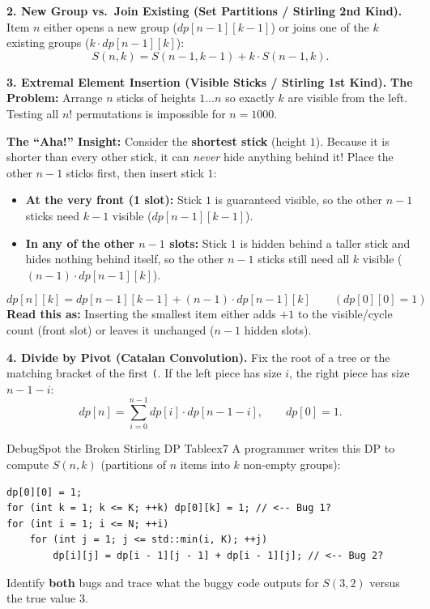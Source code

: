 \documentclass[11pt,a4paper]{article}
\theoremstyle{definition}
\newcommand{\painbeat}{\textbf{\color{accentamber}The Problem:} }
\newcommand{\ahabeat}{\textbf{\color{accentteal}The ``Aha!'' Insight:} }
\begin{document}
\noindent\textbf{2. New Group vs.\ Join Existing (Set Partitions / Stirling 2nd Kind).}
Item $n$ either opens a new group ($dp[n - 1][k - 1]$) or joins one of the $k$ existing groups ($k \cdot dp[n - 1][k]$):
\[
    S(n, k) = S(n - 1, k - 1) + k \cdot S(n - 1, k).
\]

\noindent\textbf{3. Extremal Element Insertion (Visible Sticks / Stirling 1st Kind).}
\painbeat Arrange $n$ sticks of heights $1 \dots n$ so exactly $k$ are visible from the left. Testing all $n!$ permutations is impossible for $n = 1000$.

\ahabeat Consider the \textbf{shortest stick} (height $1$). Because it is shorter than every other stick, it can \emph{never} hide anything behind it! Place the other $n - 1$ sticks first, then insert stick $1$:
\begin{itemize}
    \item \textbf{At the very front (1 slot):} Stick $1$ is guaranteed visible, so the other $n - 1$ sticks need $k - 1$ visible ($dp[n - 1][k - 1]$).
    \item \textbf{In any of the other $n - 1$ slots:} Stick $1$ is hidden behind a taller stick and hides nothing behind itself, so the other $n - 1$ sticks still need all $k$ visible ($(n - 1) \cdot dp[n - 1][k]$).
\end{itemize}

\begin{formulabox}
\[
    dp[n][k] = dp[n - 1][k - 1] + (n - 1) \cdot dp[n - 1][k]
    \qquad (dp[0][0] = 1)
\]
\textbf{Read this as:} Inserting the smallest item either adds $+1$ to the visible/cycle count (front slot) or leaves it unchanged ($n - 1$ hidden slots).
\end{formulabox}

\noindent\textbf{4. Divide by Pivot (Catalan Convolution).}
Fix the root of a tree or the matching bracket of the first \texttt{(}. If the left piece has size $i$, the right piece has size $n - 1 - i$:
\[
    dp[n] = \sum_{i=0}^{n-1} dp[i] \cdot dp[n - 1 - i], \qquad dp[0] = 1.
\]

\begin{tryitbox}{Debug}{Spot the Broken Stirling DP Table}{ex7}
A programmer writes this DP to compute $S(n, k)$ (partitions of $n$ items into $k$ non-empty groups):
\begin{lstlisting}[numbers=none, xleftmargin=4pt, framexleftmargin=4pt]
dp[0][0] = 1;
for (int k = 1; k <= K; ++k) dp[0][k] = 1; // <-- Bug 1?
for (int i = 1; i <= N; ++i)
    for (int j = 1; j <= std::min(i, K); ++j)
        dp[i][j] = dp[i - 1][j - 1] + dp[i - 1][j]; // <-- Bug 2?
\end{lstlisting}
Identify \textbf{both} bugs and trace what the buggy code outputs for $S(3, 2)$ versus the true value $3$.
\end{tryitbox}
\end{document}
